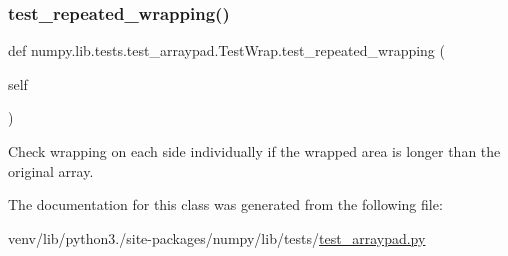 \subsubsection{\texorpdfstring{test\+\_\+repeated\+\_\+wrapping()}{test\_repeated\_wrapping()}}
{\footnotesize\ttfamily def numpy.\+lib.\+tests.\+test\+\_\+arraypad.\+Test\+Wrap.\+test\+\_\+repeated\+\_\+wrapping (\begin{DoxyParamCaption}\item[{}]{self }\end{DoxyParamCaption})}

\begin{DoxyVerb}Check wrapping on each side individually if the wrapped area is longer
than the original array.
\end{DoxyVerb}
 

The documentation for this class was generated from the following file\+:\begin{DoxyCompactItemize}
\item 
venv/lib/python3./site-\/packages/numpy/lib/tests/\hyperlink{test__arraypad_8py}{test\+\_\+arraypad.\+py}\end{DoxyCompactItemize}

